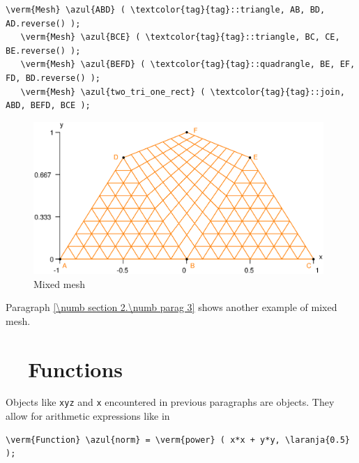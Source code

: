 \begin{Verbatim}[commandchars=\\\{\},formatcom=\small\tt,frame=single,
   label=parag-\ref{\numb section 1.\numb parag 5}.cpp,rulecolor=\color{coment},
   baselinestretch=0.94,framesep=2mm]
   \verm{Mesh} \azul{ABD} ( \textcolor{tag}{tag}::triangle, AB, BD, AD.reverse() );
   \verm{Mesh} \azul{BCE} ( \textcolor{tag}{tag}::triangle, BC, CE, BE.reverse() );
   \verm{Mesh} \azul{BEFD} ( \textcolor{tag}{tag}::quadrangle, BE, EF, FD, BD.reverse() );
   \verm{Mesh} \azul{two_tri_one_rect} ( \textcolor{tag}{tag}::join, ABD, BEFD, BCE );
\end{Verbatim}

\begin{figure}[ht] \centering
  \includegraphics[width=110mm]{two-tri-one-rect}
  \caption{Mixed mesh}
  \label{\numb section 1.\numb fig 8}
\end{figure}

Paragraph \ref{\numb section 2.\numb parag 3} shows another example of mixed mesh.


\section{~~Functions}\label{\numb section 1.\numb parag 6}

Objects like {\small\tt xyz} and {\small\tt x} encountered in previous paragraphs
are {\small\tt {}} objects.
They allow for arithmetic expressions like in

\begin{Verbatim}[commandchars=\\\{\},formatcom=\small\tt,baselinestretch=0.94]
   \verm{Function} \azul{norm} = \verm{power} ( x*x + y*y, \laranja{0.5} );
\end{Verbatim}

